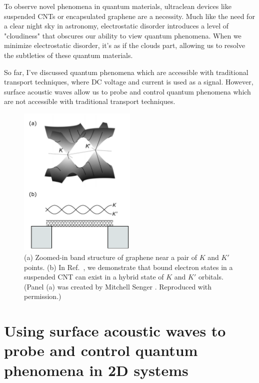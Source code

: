 \documentclass{beavtex_dub_edit}
\begin{document}
To observe novel phenomena in quantum materials, ultraclean devices like suspended CNTs or encapsulated graphene are a necessity. Much like the need for a clear night sky in astronomy, electrostatic disorder introduces a level of "cloudiness" that obscures our ability to view quantum phenomena. When we minimize electrostatic disorder, it’s as if the clouds part, allowing us to resolve the subtleties of these quantum materials. 

So far, I've discussed quantum phenomena which are accessible with traditional transport techniques, where DC voltage and current is used as a signal. However, surface acoustic waves allow us to probe and control quantum phenomena which are not accessible with traditional transport techniques. 

\begin{figure}
    \includegraphics[width = 0.5\textwidth]{CNT intro fig}
    \caption[(a) Zoomed-in band structure of graphene near a pair of $K$ and $K'$ points. (b) In Ref.\ \cite{berg_vernier_2024}, we demonstrate that bound electron states in a suspended CNT can exist in a hybrid state of $K$ and $K'$ orbitals.]{(a) Zoomed-in band structure of graphene near a pair of $K$ and $K'$ points. (b) In Ref.\ \cite{berg_vernier_2024}, we demonstrate that bound electron states in a suspended CNT can exist in a hybrid state of $K$ and $K'$ orbitals. (Panel (a) was created by Mitchell Senger \cite{senger_optoelectronics_2021}. Reproduced with permission.)}
    \label{CNT intro fig}
\end{figure}

\section[Using surface acoustic waves to probe and control quantum phenomena in 2D systems][Using SAWs to probe and control quantum phenomena in 2D systems]{Using surface acoustic waves to probe and control quantum phenomena in 2D systems} \label{using surface acoustic waves to probe and control quantum phenomena}
\end{document}
